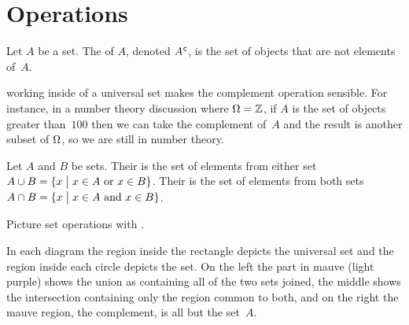 \documentclass{test}  %
\begin{document}
\section{Operations}

\begin{df}
Let $A$ be a set.
The  of $A$, denoted ${A}^{\mspace{1mu}\mathsf{c}}$, is the 
set of objects that are not elements of~$A$.  
\end{df}

\noindent\remark
working inside of a universal set makes the complement
operation sensible. 
For instance, in a number theory discussion where $\Omega=\mathbb{Z}$, 
if $A$ is the set of objects greater than~$100$ then we can
take the complement of~$A$ and the result is another subset of 
$\Omega$, so 
we are still in number theory.

\begin{df}
Let $A$ and $B$ be sets.
Their  is the set of elements 
from either set 
$A\cup B=\{x \bigm| \text{$x\in A$ or $x\in B$}\}$.  
Their  is the set of elements 
from both sets
$A\cap B=\{x \bigm| \text{$x\in A$ and $x\in B$}\}$.  
\end{df}

Picture set operations with .
\begin{center}
  \hspace*{3em}
  \hspace*{3em}
\end{center}
In each diagram
the region inside the rectangle depicts the universal set and the 
region inside each circle depicts the set.
On the left the part in mauve (light purple) shows 
the union as containing all of the two sets joined, 
the middle shows the intersection
containing only the region common to both,
and on the right the mauve region, the complement, is all but the set~$A$.
\end{document}
